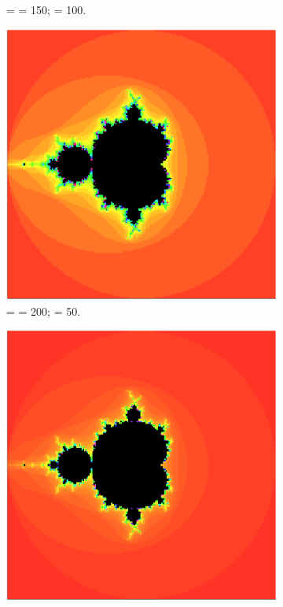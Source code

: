 \begin{figure}
\begin{subfigure}[t]{0.3\textwidth}
        \caption{ =  = 150;  = 100.}
    \end{subfigure}
    \begin{subfigure}[t]{0.3\textwidth}
        \centering
        \includegraphics[scale=0.15]{../figures/fractal-n200-mx050}
        \caption{ =  = 200;  = 50.}
    \end{subfigure}
    \begin{subfigure}[t]{0.3\textwidth}
        \centering
        \includegraphics[scale=0.15]{../figures/fractal-n200-mx100}

\end{subfigure}
\end{figure}
